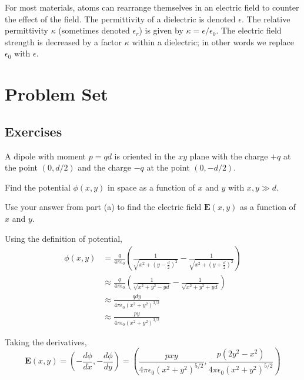 \documentclass[11pt]{scrartcl}
\begin{document}
\begin{defn}[Dielectrics]
    For most materials, atoms can rearrange themselves in an electric field to counter the effect of the field. The permittivity of a dielectric is denoted $\epsilon$. The relative permittivity $\kappa$ (sometimes denoted $\epsilon_r$) is given by $\kappa = \epsilon/\epsilon_0.$ The electric field strength is decreased by a factor $\kappa$ within a dielectric; in other words we replace $\epsilon_0$ with $\epsilon$.
\end{defn}

\section{Problem Set}

\subsection{Exercises}

\begin{prob}
    A dipole with moment $p=qd$ is oriented in the $xy$ plane with the charge $+q$ at the point $(0,d/2)$ and the charge $-q$ at the point $(0,-d/2)$. \begin{anum}
        \item Find the potential $\phi(x,y)$ in space as a function of $x$ and $y$ with $x,y\gg d$.
        \item Use your answer from part (a) to find the electric field $\mathbf E(x,y)$ as a function of $x$ and $y$.
    \end{anum}
\end{prob}

\begin{sol}
    \begin{anum}
        \item Using the definition of potential, \begin{align*}\phi(x,y)&=\frac{q}{4\pi\epsilon_0}\left(\frac{1}{\sqrt{x^2+\left(y-\frac d2\right)^2}}-\frac{1}{\sqrt{x^2+\left(y+\frac d2\right)^2}}\right)\\
        &\approx\frac{q}{4\pi\epsilon_0}\left(\frac{1}{\sqrt{x^2+y^2-yd}}-\frac{1}{\sqrt{x^2+y^2+yd}}\right)\\
        &\approx\frac{qdy}{4\pi\epsilon_0(x^2+y^2)^{3/2}}\\
        &\approx \boxed{\frac{py}{4\pi\epsilon_0(x^2+y^2)^{3/2}}}\end{align*}
        \item Taking the derivatives, $$\mathbf{E}(x,y)=\left(-\frac{d\phi}{dx},-\frac{d\phi}{dy}\right)=\boxed{\left(\frac{pxy}{4\pi\epsilon_0(x^2+y^2)^{5/2}},\frac{p(2y^2-x^2)}{4\pi\epsilon_0(x^2+y^2)^{5/2}}\right)}$$
    \end{anum}
\end{sol}
\end{document}
